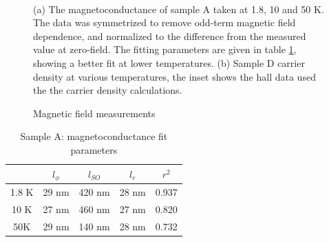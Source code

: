 \noindent 
\begin{figure}
\begin{centering}
~~
\par\end{centering}
\caption{Magnetic field measurements\label{fig:Magnetic-field-measurment}}

(a) The magnetoconductance of sample A taken at 1.8, 10 and 50 K.
The data was symmetrized to remove odd-term magnetic field dependence,
and normalized to the difference from the measured value at zero-field.
The fitting parameters are given in table \ref{tab:Sample-A:-magnetoconductance},
showing a better fit at lower temperatures. (b) Sample D carrier density
at various temperatures, the inset shows the hall data used the the
carrier density calculations.
\end{figure}

\noindent 
\begin{table}
\begin{centering}
\begin{tabular}{|c|c|c|c|c|}
\hline 
 & $l_{\phi}$ & $l_{SO}$ & $l_{e}$ & $r^{2}$\tabularnewline
\hline 
\hline 
1.8 K & 29 nm & 420 nm & 28 nm & 0.937\tabularnewline
\hline 
10 K & 27 nm & 460 nm & 27 nm & 0.820\tabularnewline
\hline 
50K & 29 nm & 140 nm & 28 nm & 0.732\tabularnewline
\hline 
\end{tabular}
\par\end{centering}
\caption{Sample A: magnetoconductance fit parameters\label{tab:Sample-A:-magnetoconductance}}
\end{table}

